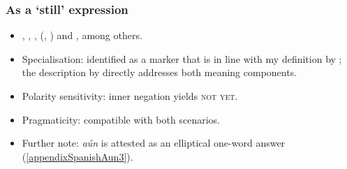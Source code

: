 \subsubsection{As a \lq{}still\rq{ }expression}
\begin{itemize}
	\item \Textcite{vanderAuwera1998}, \textcite{Garrido1993}, \textcite{OlivaresSorpena2001}, \citeauthor{RAEGramatica} (\citeyear[§30.8r]{RAEGramatica}, \citeyear[s.v. \textit{aun}]{RAEDictionary}) and \textcite{Trujillo1990}, among others.
	\item Specialisation: identified as a marker that is in line with my definition by \textcite{vanderAuwera1998}; the description by \textcite{RAEGramatica} directly addresses both meaning components.
	\item Polarity sensitivity: inner negation yields \textsc{not yet}.
	\item Pragmaticity: compatible with both scenarios.
	\item Further note: \textit{aún} is attested as an elliptical one-word answer (\ref{appendixSpanishAun3}).
\end{itemize}
